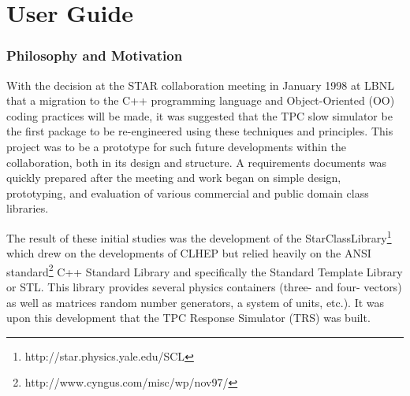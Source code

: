 \documentclass[twoside]{article}
\newcommand{\name}[1]{\textsf{#1}}%
\begin{document}
\part{User Guide}
\clearpage

\section{Philosophy and Motivation} 
\label{Philosophy}

With the decision at the STAR collaboration meeting in January 1998
at LBNL that a migration to the C++ programming language and 
Object-Oriented (OO)
coding practices will be made, it was suggested that the TPC slow simulator
be the first package to be re-engineered using these techniques
and principles.  This project was to be a prototype for such future
developments within the collaboration, both in its design and structure.  
A requirements documents was quickly prepared after the meeting
and work began on simple design, prototyping, and evaluation of 
various commercial and public domain class libraries.

The result of these initial studies was the development of the 
StarClassLibrary\footnote{http://star.physics.yale.edu/SCL} 
 which drew on the developments of 
CLHEP  
but relied heavily on the
ANSI  standard\footnote{http://www.cyngus.com/misc/wp/nov97/} 
C++ Standard Library and specifically the Standard Template
Library or STL.   This library provides several
physics containers (three- and four- vectors) as well as matrices
random number generators, a system of units, etc.).  It was upon this
development that the \name{TPC Response Simulator} (\name{TRS}) was built.
\end{document}
